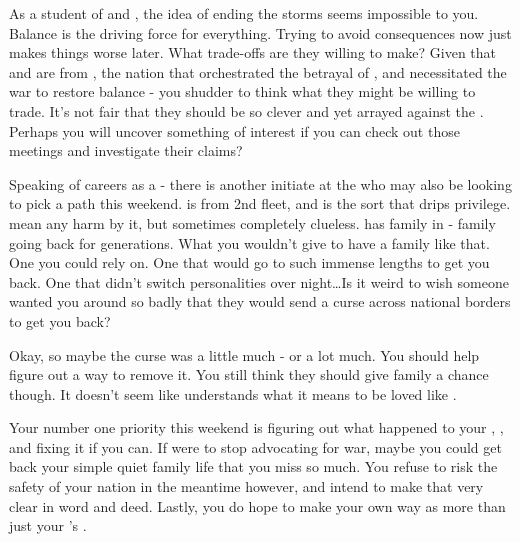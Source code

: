 \documentclass[char]{GL2020}
\begin{document}
As a student of \cEbb{} and \cFlow{}, the idea of ending the storms seems impossible to you. Balance is the driving force for everything. Trying to avoid consequences now just makes things worse later. What trade-offs are they willing to make? Given that \cHeadScientist{} and \cAssistantScientist{} are from \pTech{}, the nation that orchestrated the betrayal of \pShip{}, and necessitated the war to restore balance - you shudder to think what they might be willing to trade. It’s not fair that they should be so clever and yet arrayed against the \pShip{}. Perhaps you will uncover something of interest if you can check out those meetings and investigate their claims?

Speaking of careers as a \cWarlordDaughter{\cleric} - there is another initiate at the \pSchool{} who may also be looking to pick a path this weekend. \cInitiate{} is from 2nd fleet, and is the sort that drips privilege. \cInitiate{\They}  mean any harm by it, but sometimes \cInitiate{\they} \cInitiate{\are} completely clueless. \cInitiate{} has family in \pFarm{} - family going back for generations. What you wouldn’t give to have a family like that. One you could rely on. One that would go to such immense lengths to get you back. One that didn’t switch personalities over night\ldots Is it weird to wish someone wanted you around so badly that they would send a curse across national borders to get you back?

Okay, so maybe the curse was a little much - or a lot much. You should help \cInitiate{} figure out a way to remove it. You still think they should give \cInitiate{\their} family a chance though. It doesn’t seem like \cInitiate{} understands what it means to be loved like \cInitiate{\they} \cInitiate{\are}. 

Your number one priority this weekend is figuring out what happened to your \cLoud{\parent}, \cLoud{}, and fixing it if you can. If \cLoud{\they} were to stop advocating for war, maybe you could get back your simple quiet family life that you miss so much. You refuse to risk the safety of your nation in the meantime however, and intend to make that very clear in word and deed. Lastly, you do hope to make your own way as more than just your \cLoud{\parent}’s \cWarlordDaughter{\child}.
\end{document}
